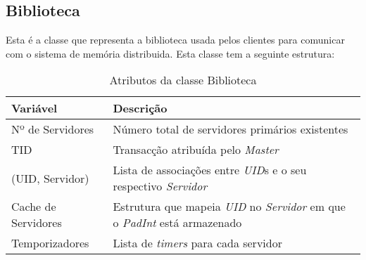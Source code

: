 \subsection{Biblioteca}
Esta é a classe que representa a biblioteca usada pelos clientes para comunicar com o sistema de memória distribuida. Esta classe tem a seguinte estrutura:

\begin{table}[H]
\centering
\begin{tabular}{| p{} | p{5cm} |}
\hline
\textbf{Variável} & \textbf{Descrição} \\
\hline
Nº de Servidores & Número total de servidores primários existentes  \\
\hline
TID & Transacção atribuída pelo \textit{Master} \\
\hline
(UID, Servidor) & Lista de associações entre \textit{UID}s e o seu respectivo \textit{Servidor} \\
\hline
Cache de Servidores & Estrutura que mapeia \textit{UID} no \textit{Servidor} em que o \textit{PadInt} está armazenado \\
\hline
Temporizadores & Lista de \textit{timers} para cada servidor \\
\hline
\end{tabular}
\caption{Atributos da classe Biblioteca} \label{lib}
\end{table}